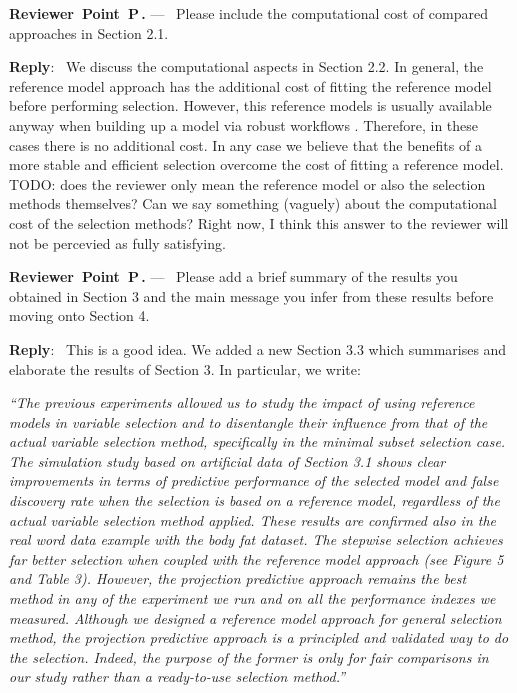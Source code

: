 \documentclass[11pt]{article}
\newcounter{reviewer}
\newcounter{point}[reviewer]
\renewcommand{\thepoint}{P\,\thereviewer.\arabic{point}}
\newenvironment{point}
   {\refstepcounter{point} \bigskip \noindent \begin{sf}{\textbf{Reviewer~Point~\thepoint} } ---\ }
   {\par \end{sf}}
\newenvironment{reply}
   {\medskip \noindent \textbf{Reply}:\  }
   {\medskip}
\begin{document}
\begin{point}
Please include the computational cost of compared approaches in Section 2.1. 
\end{point}

\begin{reply}
We discuss the computational aspects in Section 2.2. In general, the reference model approach has the additional cost of fitting the reference model before performing selection. However, this reference models is usually available anyway when building up a model via robust workflows \citep{gelman2020bayesian}. Therefore, in these cases there is no additional cost. In any case we believe that the benefits of a more stable and efficient selection overcome the cost of fitting a reference model.
TODO: does the reviewer only mean the reference model or also the selection methods themselves? Can we say something (vaguely) about the computational cost of the selection methods? Right now, I think this answer to the reviewer will not be percevied as fully satisfying.
\end{reply}

\begin{point}
Please add a brief summary of the results you obtained in Section 3 and the main message you infer from these results before moving onto Section 4.
\end{point}

\begin{reply}
This is a good idea. We added a new Section 3.3 which summarises and elaborate the results of Section 3. In particular, we write:

\vspace{0.5cm}
\textit{
``The previous experiments allowed us to study the impact of using reference models in variable selection and to disentangle their influence from that of the actual variable selection method, specifically in the minimal subset selection case.
The simulation study based on artificial data of Section 3.1 shows clear improvements in terms of predictive performance of the selected model and false discovery rate when the selection is based on a reference model, regardless of the actual variable selection method applied. These results are confirmed also in the real word data example with the body fat dataset. The stepwise selection achieves far better selection when coupled with the reference model approach (see Figure 5 and Table 3). However, the projection predictive approach remains the best method in any of the experiment we run and on all the performance indexes we measured. Although we designed a reference model approach for general selection method, the projection predictive approach is a principled and validated way to do the selection. Indeed, the purpose of the former is only for fair comparisons in our study rather than a ready-to-use selection method.''
}
\vspace{0.5cm}
\end{reply}
\end{document}
